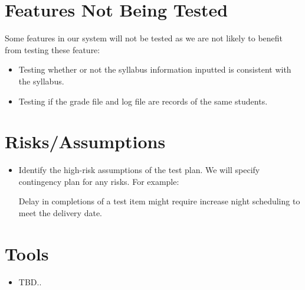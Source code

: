 \documentclass[12pt]{article}
\begin{document}
\section{Features Not Being Tested}
Some features in our system will not be tested as we are not likely to benefit from testing these feature:
\begin{itemize}
	\item Testing whether or not the syllabus information inputted is consistent with the syllabus.
	\item Testing if the grade file and log file are records of the same students.
\end{itemize}

\section{Risks/Assumptions}
\begin{itemize}
	\item Identify the high-risk assumptions of the test plan. We will specify contingency plan for any risks. For example:
	\begin{itemize}
	Delay in completions of a test item might require increase night scheduling to meet the delivery date.
	\end{itemize}
\end{itemize}

\section{Tools}
\begin{itemize}
	\item TBD..
\end{itemize}
\end{document}
